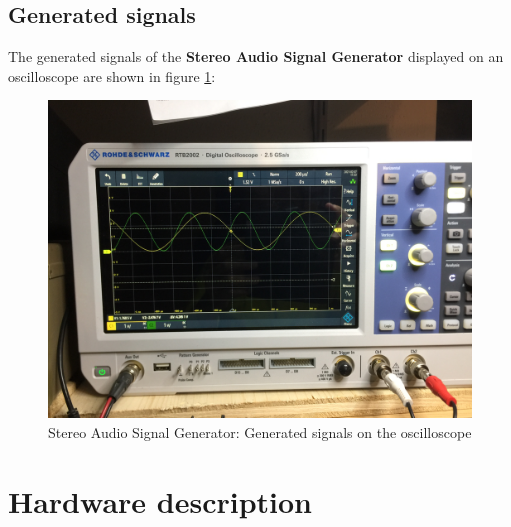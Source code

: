 \documentclass[11pt, oneside]{scrartcl}   	%
\begin{document}
\subsection{Generated signals} 
The generated signals of the \textbf{Stereo Audio Signal Generator} displayed on an oscilloscope are shown in figure \ref{fig:signalview}:
\begin{figure}[tbph]
	\centering
	\includegraphics[width=\linewidth]{AudioSignalGeneratorOscilloscopeWaveforms.jpeg}
	\caption[Stereo Audio Signal Generator: Generated signals]{Stereo Audio Signal Generator: Generated signals on the oscilloscope}
	\label{fig:signalview}
\end{figure}
\newpage

\section{Hardware description}
\end{document}
